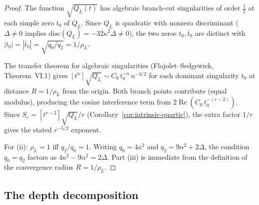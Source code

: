 \begin{proof}
The function $\sqrt{Q_L(t)}$ has algebraic branch-cut
singularities of order $\tfrac{1}{2}$ at each simple zero
$t_0$ of $Q_L$. Since $Q_L$ is quadratic with nonzero
discriminant ($\Delta \neq 0$ implies
$\mathrm{disc}(Q_L) = -32\kappa^2\Delta \neq 0$),
the two zeros $t_0, \bar{t}_0$ are distinct with
$|t_0| = |{\bar t}_0| = \sqrt{q_0/q_2} = 1/\rho_L$.

The transfer theorem for algebraic singularities
(Flajolet--Sedgewick, Theorem~VI.1) gives
$[t^n]\sqrt{Q_L} \sim C_0\,t_0^{-n}\,n^{-3/2}$
for each dominant singularity $t_0$ at distance
$R = 1/\rho_L$ from the origin. Both branch points
contribute (equal modulus), producing the cosine
interference term from
$2\operatorname{Re}(C_0\,t_0^{-(r-2)})$.
Since $S_r = [t^{r-2}]\sqrt{Q_L}/r$
(Corollary~\ref{cor:intrinsic-quartic}), the extra
factor $1/r$ gives the stated $r^{-5/2}$ exponent.

For (ii): $\rho_L = 1$ iff $q_2/q_0 = 1$. Writing
$q_0 = 4\kappa^2$ and $q_2 = 9\alpha^2 + 2\Delta$, the
condition $q_0 = q_2$ factors as
$4\kappa^2 - 9\alpha^2 = 2\Delta$.
Part (iii) is immediate from the definition of the
convergence radius $R = 1/\rho_L$.
\end{proof}

\subsection{The depth decomposition}

